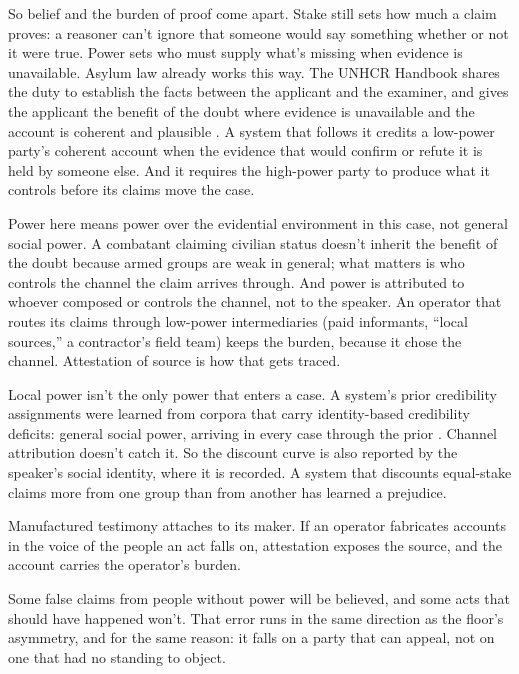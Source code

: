 So belief and the burden of proof come apart. Stake still sets how much a claim proves: a reasoner can't ignore that someone would say something whether or not it were true. Power sets who must supply what's missing when evidence is unavailable. Asylum law already works this way. The UNHCR Handbook shares the duty to establish the facts between the applicant and the examiner, and gives the applicant the benefit of the doubt where evidence is unavailable and the account is coherent and plausible \autocite{unhcr1979handbook}. A system that follows it credits a low-power party's coherent account when the evidence that would confirm or refute it is held by someone else. And it requires the high-power party to produce what it controls before its claims move the case.

Power here means power over the evidential environment in this case, not general social power. A combatant claiming civilian status doesn't inherit the benefit of the doubt because armed groups are weak in general; what matters is who controls the channel the claim arrives through. And power is attributed to whoever composed or controls the channel, not to the speaker. An operator that routes its claims through low-power intermediaries (paid informants, “local sources,” a contractor's field team) keeps the burden, because it chose the channel. Attestation of source is how that gets traced.

Local power isn't the only power that enters a case. A system's prior credibility assignments were learned from corpora that carry identity-based credibility deficits: general social power, arriving in every case through the prior \autocite{fricker2007epistemic}. Channel attribution doesn't catch it. So the discount curve is also reported by the speaker's social identity, where it is recorded. A system that discounts equal-stake claims more from one group than from another has learned a prejudice.

Manufactured testimony attaches to its maker. If an operator fabricates accounts in the voice of the people an act falls on, attestation exposes the source, and the account carries the operator's burden.

Some false claims from people without power will be believed, and some acts that should have happened won't. That error runs in the same direction as the floor's asymmetry, and for the same reason: it falls on a party that can appeal, not on one that had no standing to object.



